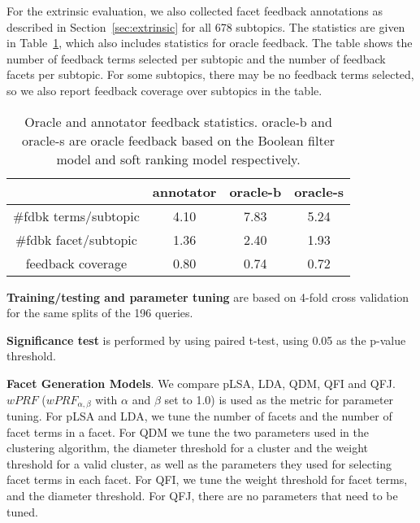For the extrinsic evaluation, we also collected facet feedback annotations as described in Section~\ref{sec:extrinsic} for all  678 subtopics. The statistics are given in Table~\ref{tab:feedback-terms}, which also includes statistics for oracle feedback. The table shows the number of feedback terms selected per subtopic and the number of feedback facets per subtopic. For some subtopics, there may be no feedback terms selected, so we also report feedback coverage over subtopics in the table. 
\begin{table}[H]
\centering
\caption{Oracle and annotator feedback statistics. oracle-b and oracle-s are oracle feedback based on the Boolean filter model and soft ranking model respectively.}
\label{tab:feedback-terms}
\begin{tabular}{|c|c|c|c|} \hline
	    & annotator & oracle-b & oracle-s\\ \hline
\#fdbk terms/subtopic & 4.10 & 7.83 & 5.24 \\ \hline
\#fdbk facet/subtopic & 1.36 & 2.40 & 1.93 \\  \hline
feedback coverage &  0.80 & 0.74 & 0.72 \\  \hline
\end{tabular}
\end{table}


\textbf{Training/testing and parameter tuning} are based on 4-fold cross validation for the same splits of the 196 queries.

\textbf{Significance test} is performed by using paired t-test, using 0.05 as the p-value threshold.

\textbf{Facet Generation Models}. We compare pLSA, LDA, QDM, QFI and QFJ. $wPRF$ ($wPRF_{\alpha,\beta}$ with $\alpha$ and $\beta$ set to 1.0) is used as the metric for parameter tuning. For pLSA and LDA, we tune the number of facets and the number of facet terms in a facet. For QDM we tune the two parameters used in the clustering algorithm, the diameter threshold for a cluster and the weight threshold for a valid cluster, as well as the parameters they used for selecting facet terms in each facet. 
For QFI, we tune the weight threshold for facet terms, and the diameter threshold. For QFJ, there are no parameters that need to be tuned.

